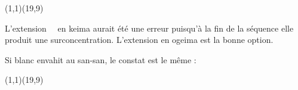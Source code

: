 \documentclass[preview, border=0pt, varwidth=false]{standalone}
\begin{document}
	\setgounit{0.4cm} 
	
\parbox[c][14.65cm][c]{10.2cm}{
	\centering
	
	\begin{psgopartialboard}{(1,1)(19,9)}
		\pass
		\pass*
	\end{psgopartialboard}
	
	\vspace{1em}
	L'extension \,  \marktr \,  en keima aurait été une erreur puisqu'à la fin de la séquence elle produit une surconcentration. L'extension  en ogeima est la bonne option. 

	\bigskip

	Si blanc envahit au san-san, le constat est le même : 	
	\begin{psgopartialboard}{(1,1)(19,9)}
		\pass
	\end{psgopartialboard}
}
\end{document}
